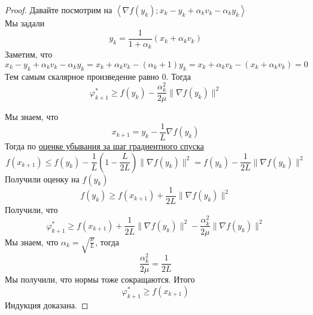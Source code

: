 \begin{proof}
  Давайте посмотрим на  $\left\langle \nabla f(y_k); x_k- y_k + \alpha_k v_k - \alpha_k y_k  \right\rangle$ \\
  Мы задали
  \[
  y_k = \frac{1}{1+\alpha_k}(x_k + \alpha_k v_k)
  \]
  Заметим, что
  \[
  x_k - y_k + \alpha_k v_k - \alpha_ky_k  = x_k + \alpha_kv_k - (\alpha_k + 1)y_k =
  x_k + \alpha_k v_k - (x_k + \alpha_k v_k) = 0
  \]
  Тем самым скалярное произведение равно 0. Тогда
  \[
  \varphi_{k+1}^{*} \ge f(y_k) - \frac{\alpha_k^2}{2\mu} \| \nabla f(y_k) \|^2
  \]

  Мы знаем, что
  \[
  x_{k+1} = y_k - \frac{1}{L} \nabla f(y_k)
  \]
  Тогда по \hyperref[note:FFEA1F1D-B70C-4B4A-9386-8344A2A3BBC4]{оценке убывания за шаг градиентного спуска}
  \[
  f(x_{k+1}) \le f(y_k) - \frac{1}{L} \left( 1 - \frac{L}{2L} \right) \|\nabla f(y_k)\|^2 =
  f(y_k) - \frac{1}{2L} \|\nabla f(y_k)\|^2
  \]
  Получили оценку на $f(y_k)$
  \[
  f(y_k) \ge f(x_{k+1}) + \frac{1}{2L}\|\nabla f(y_k)\|^2
  \]
  Получили, что
  \[
  \varphi_{k+1}^{*} \ge f(x_{k+1}) + \frac{1}{2L} \|\nabla f(y_k)\|^2 - \frac{\alpha_k^2}{2\mu} \| \nabla f(y_k) \|^2
  \]
  Мы знаем, что $\alpha_k =\sqrt{\frac{\mu}{L}}$, тогда
  \[\frac{\alpha_k^2}{2\mu} = \frac{1}{2L}\]
  Мы получили, что нормы тоже сокращаются. Итого
  \[
  \varphi^{*}_{k+1} \ge f(x_{k+1})
  \]
  Индукция доказана.
\end{proof}

